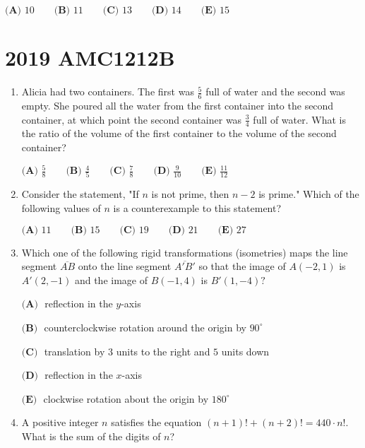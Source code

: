\documentclass{article}
\begin{document}
\begin{enumerate}[label=\arabic*., itemsep=0.5em]
\(\textbf{(A) } 10 \qquad \textbf{(B) }11 \qquad \textbf{(C) } 13\qquad \textbf{(D) } 14 \qquad \textbf{(E) } 15\)\par \vspace{0.5em}\end{enumerate}\newpage\section*{2019 AMC1212B}\begin{enumerate}[label=\arabic*., itemsep=0.5em]\item Alicia had two containers. The first was \(\tfrac{5}{6}\) full of water and the second was empty. She poured all the water from the first container into the second container, at which point the second container was \(\tfrac{3}{4}\) full of water. What is the ratio of the volume of the first container to the volume of the second container?

\(\textbf{(A) } \frac{5}{8} \qquad \textbf{(B) } \frac{4}{5} \qquad \textbf{(C) } \frac{7}{8} \qquad \textbf{(D) } \frac{9}{10} \qquad \textbf{(E) } \frac{11}{12}\)\par \vspace{0.5em}\item Consider the statement, "If \(n\) is not prime, then \(n-2\) is prime." Which of the following values of \(n\) is a counterexample to this statement?

\(\textbf{(A) } 11 \qquad \textbf{(B) } 15 \qquad \textbf{(C) } 19 \qquad \textbf{(D) } 21 \qquad \textbf{(E) } 27\)\par \vspace{0.5em}\item Which one of the following rigid transformations (isometries) maps the line segment \(\overline{AB}\) onto the line segment \(\overline{A'B'}\) so that the image of \(A(-2,1)\) is \(A'(2,-1)\) and the image of \(B(-1,4)\) is \(B'(1,-4)?\)

\(\textbf{(A) } \) reflection in the \(y\)-axis

\(\textbf{(B) } \) counterclockwise rotation around the origin by \(90^{\circ}\)

\(\textbf{(C) } \) translation by \(3\) units to the right and \(5\) units down

\(\textbf{(D) } \) reflection in the \(x\)-axis

\(\textbf{(E) } \) clockwise rotation about the origin by \(180^{\circ}\)\par \vspace{0.5em}\item A positive integer \(n\) satisfies the equation \((n+1)!+(n+2)!=440\cdot n!\). What is the sum of the digits of \(n\)?


\end{enumerate}
\end{document}
